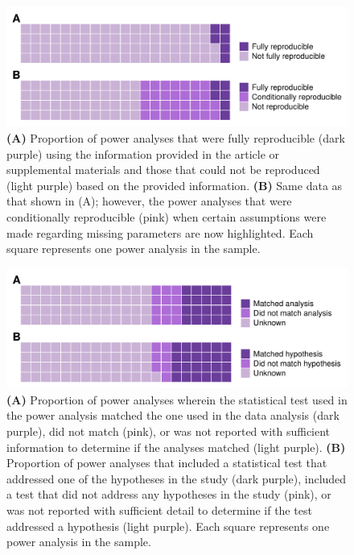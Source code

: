 \documentclass[
  doc, donotrepeattitle,floatsintext]{apa7}
\begin{document}
\clearpage

\begin{figure}

{\centering \includegraphics{../../figs/fig1} 

}

\caption{\normalfont
\textbf{(A)} Proportion of power analyses that were fully reproducible (dark purple) using the information provided in the article or supplemental materials and those that could not be reproduced (light purple) based on the provided information. \textbf{(B)} Same data as that shown in (A); however, the power analyses that were conditionally reproducible (pink) when certain assumptions were made regarding missing parameters are now highlighted. Each square represents one power analysis in the sample.}\label{fig:fig1}
\end{figure}




\clearpage

\begin{figure}

{\centering \includegraphics{../../figs/fig2} 

}

\caption{\normalfont
\textbf{(A)} Proportion of power analyses wherein the statistical test used in the power analysis matched the one used in the data analysis (dark purple), did not match (pink), or was not reported with sufficient information to determine if the analyses matched (light purple). \textbf{(B)} Proportion of power analyses that included a statistical test that addressed one of the hypotheses in the study (dark purple), included a test that did not address any hypotheses in the study (pink), or was not reported with sufficient detail to determine if the test addressed a hypothesis (light purple). Each square represents one power analysis in the sample.}\label{fig:fig2}
\end{figure}
\end{document}

